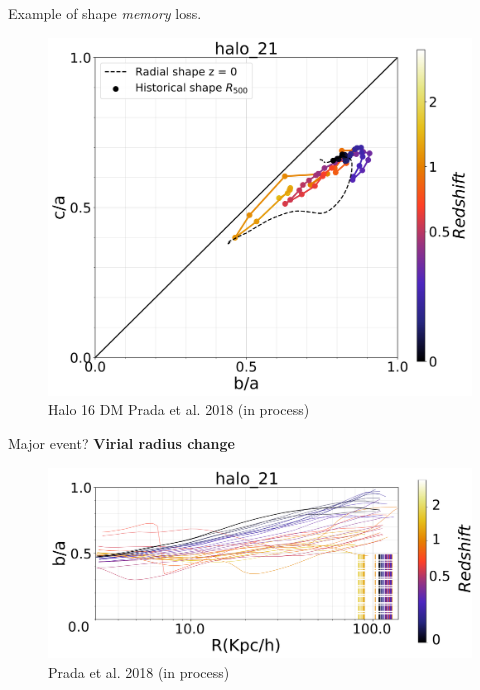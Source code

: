 \documentclass[xcolor=dvipsnames]{beamer}
\begin{document}
\begin{frame}
\centering
Example of shape \textit{memory} loss.
\begin{figure}[!ht]
  \centering
 \includegraphics[width=0.6\columnwidth]{../Document/pics/Redshift/halo_21_level3_DM_Z_Triax.png}
 \caption{Halo 16 DM \tiny Prada et al. 2018 (in process)}
  

  \label{fig:RedshiftDM}
\end{figure}
\end{frame}


\begin{frame}
Major event? \textbf{Virial radius change}
\begin{figure}[!ht]
  \centering
  \includegraphics[width=1\columnwidth]{./pics/halo_21_level3_DM_Z.png}
  \caption{\tiny Prada et al. 2018 (in process)}
\end{figure}

\end{frame}
\end{document}

